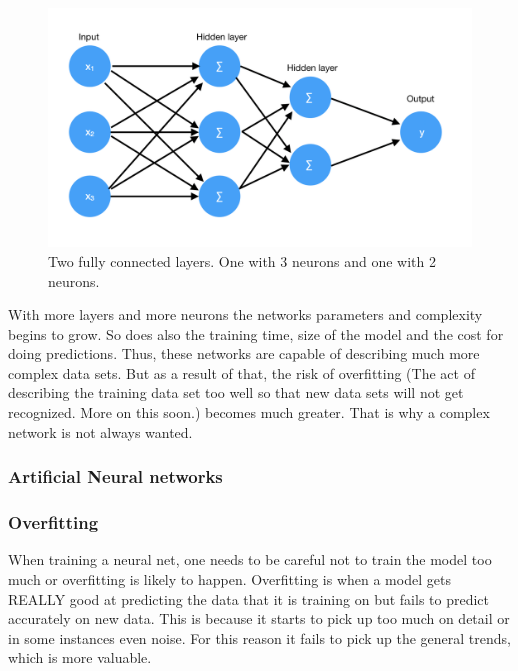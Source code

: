 \begin{figure}[hbtp]
\begin{center}
\includegraphics[width = 1.0\textwidth]{./Images/fully_connected.jpg} 
\caption{Two fully connected layers. One with 3 neurons and one with 2 neurons.}
\end{center}
\end{figure}

With more layers and more neurons the networks parameters and complexity begins to grow. So does also the training time, size of the model and the cost for doing predictions. Thus, these networks are capable of describing much more complex data sets. But as a result of that, the risk of overfitting (The act of describing the training data set too well so that new data sets will not get recognized. More on this soon.) becomes much greater. That is why a complex network is not always wanted.

\subsubsection{Artificial Neural networks}

\subsubsection{Overfitting}
When training a neural net, one needs to be careful not to train the model too much or overfitting is likely to happen. Overfitting is when a model gets REALLY good at predicting the data that it is training on but fails to predict accurately on new data. This is because it starts to pick up too much on detail or in some instances even noise. For this reason it fails to pick up the general trends, which is more valuable. 

